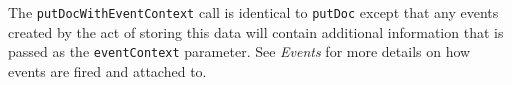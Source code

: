The \verb+putDocWithEventContext+ call is identical to \verb+putDoc+ except that
any events created by the act of storing this data will contain additional information
that is passed as the \verb+eventContext+ parameter. See \emph{Events} for more details
on how events are fired and attached to.
